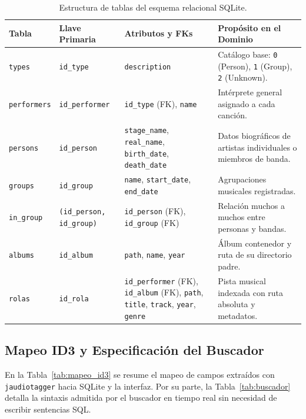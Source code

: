 \documentclass[12pt,a4paper]{article}
\begin{document}
\begin{table}[htbp]
\centering
\footnotesize
\renewcommand{\arraystretch}{0.95}
\begin{tabularx}{\textwidth}{l l p{4.8cm} X}
\toprule
\textbf{Tabla} & \textbf{Llave Primaria} & \textbf{Atributos y FKs} & \textbf{Propósito en el Dominio} \\
\midrule
\texttt{types} & \texttt{id\_type} & \texttt{description} & Catálogo base: \texttt{0} (Person), \texttt{1} (Group), \texttt{2} (Unknown). \\
\texttt{performers} & \texttt{id\_performer} & \texttt{id\_type} (FK), \texttt{name} & Intérprete general asignado a cada canción. \\
\texttt{persons} & \texttt{id\_person} & \texttt{stage\_name}, \texttt{real\_name}, \texttt{birth\_date}, \texttt{death\_date} & Datos biográficos de artistas individuales o miembros de banda. \\
\texttt{groups} & \texttt{id\_group} & \texttt{name}, \texttt{start\_date}, \texttt{end\_date} & Agrupaciones musicales registradas. \\
\texttt{in\_group} & \texttt{(id\_person, id\_group)} & \texttt{id\_person} (FK), \texttt{id\_group} (FK) & Relación muchos a muchos entre personas y bandas. \\
\texttt{albums} & \texttt{id\_album} & \texttt{path}, \texttt{name}, \texttt{year} & Álbum contenedor y ruta de su directorio padre. \\
\texttt{rolas} & \texttt{id\_rola} & \texttt{id\_performer} (FK), \texttt{id\_album} (FK), \texttt{path}, \texttt{title}, \texttt{track}, \texttt{year}, \texttt{genre} & Pista musical indexada con ruta absoluta y metadatos. \\
\bottomrule
\end{tabularx}
\caption{Estructura de tablas del esquema relacional SQLite.}
\label{tab:esquema_bd}
\end{table}

\subsection{Mapeo ID3 y Especificación del Buscador}
En la Tabla~\ref{tab:mapeo_id3} se resume el mapeo de campos extraídos con \texttt{jaudiotagger} hacia SQLite y la interfaz. Por su parte, la Tabla~\ref{tab:buscador} detalla la sintaxis admitida por el buscador en tiempo real sin necesidad de escribir sentencias SQL.
\end{document}
